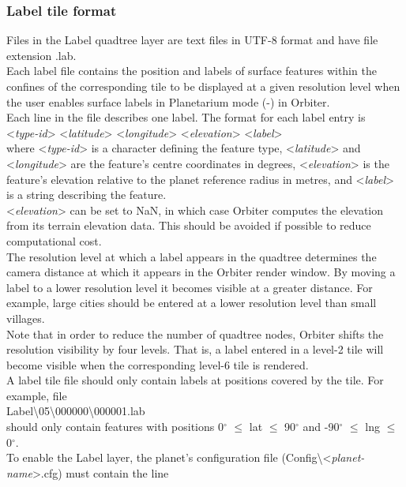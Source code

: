 \documentclass[Orbiter Developer Manual.tex]{subfiles}
\begin{document}
\subsubsection{Label tile format}
Files in the Label quadtree layer are text files in UTF-8 format and have file extension .lab.\\
Each label file contains the position and labels of surface features within the confines of the corresponding tile to be displayed at a given resolution level when the user enables surface labels in Planetarium mode (\Ctrl-) in Orbiter.\\
Each line in the file describes one label. The format for each label entry is\\
\indent <\textit{type-id}> <\textit{latitude}> <\textit{longitude}> <\textit{elevation}> <\textit{label}>\\
where <\textit{type-id}> is a character defining the feature type, <\textit{latitude}> and <\textit{longitude}> are the feature's centre coordinates in degrees, <\textit{elevation}> is the feature's elevation relative to the planet reference radius in metres, and <\textit{label}> is a string describing the feature.\\
<\textit{elevation}> can be set to NaN, in which case Orbiter computes the elevation from its terrain elevation data. This should be avoided if possible to reduce computational cost.\\
The resolution level at which a label appears in the quadtree determines the camera distance at which it appears in the Orbiter render window. By moving a label to a lower resolution level it becomes visible at a greater distance. For example, large cities should be entered at a lower resolution level than small villages.\\
Note that in order to reduce the number of quadtree nodes, Orbiter shifts the resolution visibility by four levels. That is, a label entered in a level-2 tile will become visible when the corresponding level-6 tile is rendered.\\
A label tile file should only contain labels at positions covered by the tile. For example, file\\
\indent Label\textbackslash 05\textbackslash 000000\textbackslash 000001.lab\\
should only contain features with positions 0$^{\circ}$ $\leq$ lat $\leq$ 90$^{\circ}$ and -90$^{\circ}$ $\leq$ lng $\leq$ 0$^{\circ}$.\\
To enable the Label layer, the planet's configuration file (Config\textbackslash <\textit{planet-name}>.cfg) must contain the line\\
\end{document}

